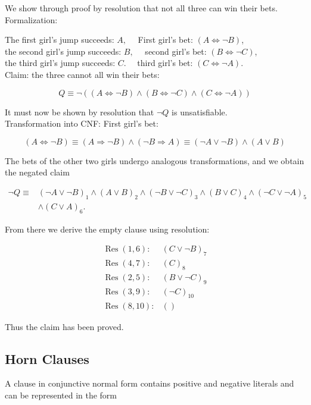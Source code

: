 \documentclass[10pt]{book}
\begin{document}
We show through proof by resolution that not all three can win their bets.\\
Formalization:

The first girl's jump succeeds: $A, \quad$ First girl's bet: $(A \Leftrightarrow \neg B)$,\\
the second girl's jump succeeds: $B, \quad$ second girl's bet: $(B \Leftrightarrow \neg C)$,\\
the third girl's jump succeeds: $C . \quad$ third girl's bet: $(C \Leftrightarrow \neg A)$.\\
Claim: the three cannot all win their bets:

$$
Q \equiv \neg((A \Leftrightarrow \neg B) \wedge(B \Leftrightarrow \neg C) \wedge(C \Leftrightarrow \neg A))
$$

It must now be shown by resolution that $\neg Q$ is unsatisfiable.\\
Transformation into CNF: First girl's bet:

$$
(A \Leftrightarrow \neg B) \equiv(A \Rightarrow \neg B) \wedge(\neg B \Rightarrow A) \equiv(\neg A \vee \neg B) \wedge(A \vee B)
$$

The bets of the other two girls undergo analogous transformations, and we obtain the negated claim

$$
\begin{aligned}
\neg Q \equiv & (\neg A \vee \neg B)_{1} \wedge(A \vee B)_{2} \wedge(\neg B \vee \neg C)_{3} \wedge(B \vee C)_{4} \wedge(\neg C \vee \neg A)_{5} \\
& \wedge(C \vee A)_{6} .
\end{aligned}
$$

From there we derive the empty clause using resolution:

$$
\begin{array}{ll}
\operatorname{Res}(1,6): & (C \vee \neg B)_{7} \\
\operatorname{Res}(4,7): & (C)_{8} \\
\operatorname{Res}(2,5): & (B \vee \neg C)_{9} \\
\operatorname{Res}(3,9): & (\neg C)_{10} \\
\operatorname{Res}(8,10): & ()
\end{array}
$$

Thus the claim has been proved.

\subsection{Horn Clauses}
A clause in conjunctive normal form contains positive and negative literals and can be represented in the form
\end{document}

